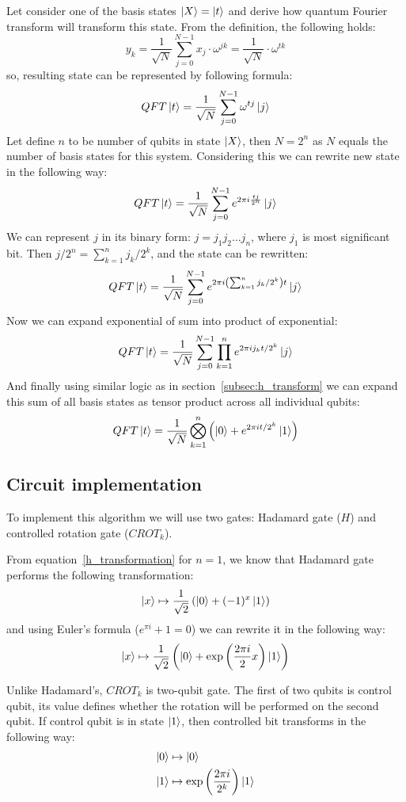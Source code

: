 Let consider one of the basis states $\ket{X} = \ket{t}$ and derive how quantum Fourier transform will transform this state.
From the definition, the following holds:
\[
    y_k = \frac{1}{\sqrt{N}}\sum_{j=0}^{N-1}x_j\cdot\omega^{jk} = \frac{1}{\sqrt{N}}\cdot\omega^{tk}
\]
so, resulting state can be represented by following formula:
\[
    QFT\ket{t} = \frac{1}{\sqrt{N}}\sum_{j=0}^{N-1} \omega^{tj}\ket{j}
\]
Let define $n$ to be number of qubits in state $\ket{X}$, then $N=2^n$ as $N$ equals the number of basis states for this system.
Considering this we can rewrite new state in the following way:
\[
    QFT\ket{t} = \frac{1}{\sqrt{N}}\sum_{j=0}^{N-1}e^{2\pi i \frac{tj}{2^n}}\ket{j}
\]
We can represent $j$ in its binary form: $j = j_1 j_2 \ldots j_n$, where $j_1$ is most significant bit.
Then $j / 2^n = \sum_{k=1}^{n} j_k/2^k$, and the state can be rewritten:
\[
    QFT\ket{t} = \frac{1}{\sqrt{N}}\sum_{j=0}^{N-1}e^{2\pi i\left( \sum_{k=1}^{n} j_k/2^k \right)t}\ket{j}
\]
Now we can expand exponential of sum into product of exponential:
\[
    QFT\ket{t} = \frac{1}{\sqrt{N}} \sum_{j=0}^{N-1} \prod_{k=1}^{n} e^{2\pi i j_k t/2^k}\ket{j}
\]
And finally using similar logic as in section~\ref{subsec:h_transform} we can expand this sum of all basis states as tensor product across all individual qubits:
\begin{align} \label{eq_qft}
    QFT\ket{t} = \frac{1}{\sqrt{N}} \bigotimes_{k=1}^{n}\left( \ket{0} + e^{2\pi i t/2^k} \ket{1} \right)
\end{align}

\subsection{Circuit implementation}

To implement this algorithm we will use two gates: Hadamard gate ($H$) and controlled rotation gate ($CROT_k$).

From equation~\eqref{h_transformation} for $n=1$, we know that Hadamard gate performs the following transformation:
\[
    \ket{x} \mapsto \frac{1}{\sqrt {2}} \left( \ket{0} + (-1)^x \ket{1} \right)
\]
and using Euler's formula ($e^{\pi i} + 1 = 0$) we can rewrite it in the following way:
\[
    \ket{x} \mapsto \frac{1}{\sqrt {2}} \left( \ket{0} + \exp \left( \frac{2 \pi i}{2} x \right) \ket{1} \right)
\]

Unlike Hadamard's, $CROT_k$ is two-qubit gate.
The first of two qubits is control qubit, its value defines whether the rotation will be performed on the second qubit.
If control qubit is in state $\ket{1}$, then controlled bit transforms in the following way:
\begin{align*}
    \ket{0} &\mapsto \ket{0} \\
    \ket{1} &\mapsto \exp\left( \frac{2\pi i}{2^k} \right)\ket{1}
\end{align*}

